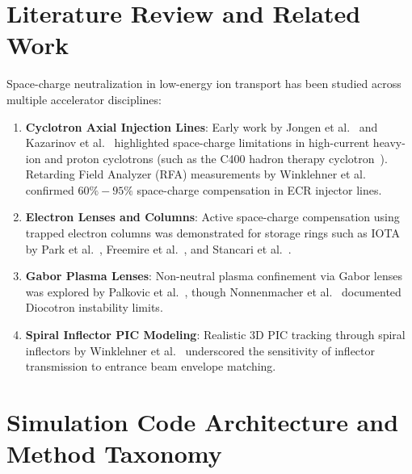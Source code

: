 \documentclass[11pt,a4paper]{article}
\begin{document}
\section{Literature Review and Related Work}

Space-charge neutralization in low-energy ion transport has been studied across multiple accelerator disciplines:
\begin{enumerate}
    \item \textbf{Cyclotron Axial Injection Lines}: Early work by Jongen et al.~\cite{Jongen1981_AxialInjectionSystems} and Kazarinov et al.~\cite{Kazarinov2007_C400_PAC07, Kazarinov2010_AxialLines_Review} highlighted space-charge limitations in high-current heavy-ion and proton cyclotrons (such as the C400 hadron therapy cyclotron~\cite{Kazarinov2009_C400_PAC09}). Retarding Field Analyzer (RFA) measurements by Winklehner et al.~\cite{Winklehner2013_NSCL_SCC, Winklehner2014_RSI_SCC_ECR} confirmed $60\% - 95\%$ space-charge compensation in ECR injector lines.
    \item \textbf{Electron Lenses and Columns}: Active space-charge compensation using trapped electron columns was demonstrated for storage rings such as IOTA by Park et al.~\cite{Park2020_IOTA_eColumn, Park2019_Simulations_IOTA}, Freemire et al.~\cite{Freemire2018_SCC_IOTA}, and Stancari et al.~\cite{Stancari2016_ElectronLenses, Stancari2021_IOTA_eLens}.
    \item \textbf{Gabor Plasma Lenses}: Non-neutral plasma confinement via Gabor lenses was explored by Palkovic et al.~\cite{Palkovic1988_GaborLens}, though Nonnenmacher et al.~\cite{Nonnenmacher2021_GaborLensInstability} documented Diocotron instability limits.
    \item \textbf{Spiral Inflector PIC Modeling}: Realistic 3D PIC tracking through spiral inflectors by Winklehner et al.~\cite{Winklehner2017_PRAB_OPAL_SpiralInflector} underscored the sensitivity of inflector transmission to entrance beam envelope matching.
\end{enumerate}

\section{Simulation Code Architecture and Method Taxonomy}
\end{document}
